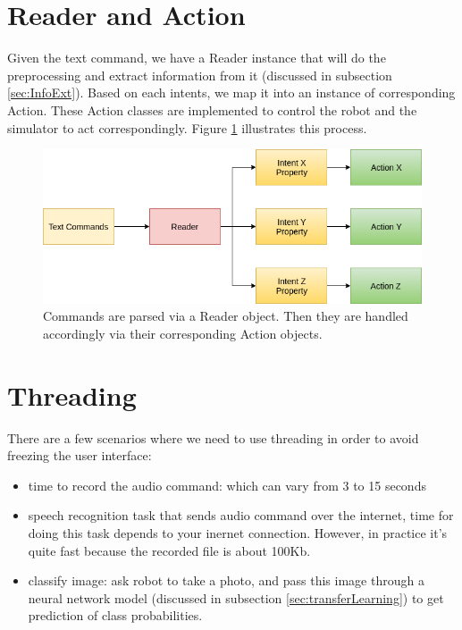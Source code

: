 \section{Reader and Action}
Given the text command, we have a Reader instance that will do the preprocessing and extract information from it (discussed in subsection \ref{sec:InfoExt}). Based on each intents, we map it into an instance of corresponding Action. These Action classes are implemented to control the robot and the simulator to act correspondingly. Figure \ref{fig:readerAction} illustrates this process. 

\begin{figure}[!htb]
	\centering
	\includegraphics[width=0.9\hsize]{./figures/readerAction}
	\caption{Commands are parsed via a Reader object. Then they are handled accordingly via their corresponding Action objects.}
	\label{fig:readerAction}
\end{figure}


\section{Threading}
There are a few scenarios where we need to use threading in order to avoid freezing the user interface:
\begin{itemize}
	\item time to record the audio command: which can vary from 3 to 15 seconds
	\item speech recognition task that sends audio command over the internet, time for doing this task depends to your inernet connection. However, in practice it's quite fast because the recorded file is about 100Kb.
	\item classify image: ask robot to take a photo, and pass this image through a neural network model (discussed in subsection \ref{sec:transferLearning}) to get prediction of class probabilities.
\end{itemize}

